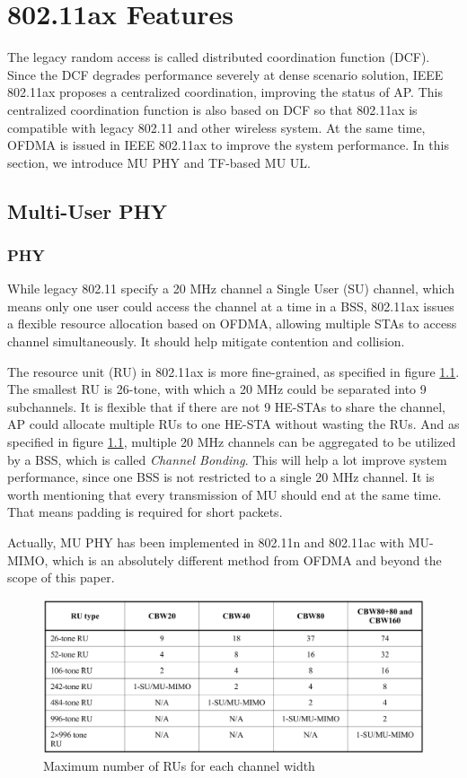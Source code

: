 \chapter{802.11ax Features}			\label{chp_ax_feature}
The legacy random access is called distributed coordination function (DCF). 
Since the DCF degrades performance severely at dense scenario solution, IEEE 802.11ax proposes a centralized coordination, improving the status of AP. 
This centralized coordination function is also based on DCF so that 802.11ax is compatible with legacy 802.11 and other wireless system. 
At the same time, OFDMA is issued in IEEE 802.11ax to improve the system performance. In this section, we introduce MU PHY and TF-based MU UL.
\section{Multi-User PHY} \label{sec_MU}
\subsection{PHY}
While legacy 802.11 specify a 20 MHz channel a Single User (SU) channel, which means only one user could access the channel at a time in a BSS, 802.11ax issues a flexible resource allocation based on OFDMA, allowing multiple STAs to access channel simultaneously.
It should help mitigate contention and collision. 

The resource unit (RU) in 802.11ax is more fine-grained, as specified in figure \ref{fig_RU_spec}. The smallest RU is 26-tone, with which a 20 MHz could be separated into 9 subchannels.
It is flexible that if there are not 9 HE-STAs to share the channel, AP could allocate multiple RUs to one HE-STA without wasting the RUs.
And as specified in figure \ref{fig_RU_spec}, multiple 20 MHz channels can be aggregated to be utilized by a BSS, which is called \textit{Channel Bonding}. 
This will help a lot improve system performance, since one BSS is not restricted to a single 20 MHz channel.  
It is worth mentioning that every transmission of MU should end at the same time. That means padding is required for short packets.



Actually, MU PHY has been implemented in 802.11n and 802.11ac with MU-MIMO, which is an absolutely different method from OFDMA and beyond the scope of this paper. 

\begin{figure}[!t]
\includegraphics[scale=0.25]{./figure/chp2/RU_spec.png}
\caption{Maximum number of RUs for each channel width}
\label{fig_RU_spec}
\end{figure}


